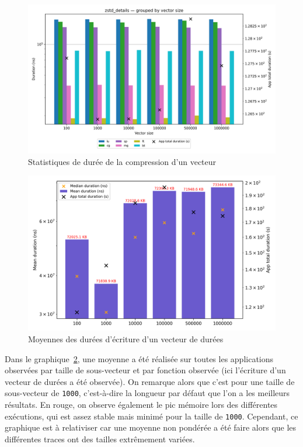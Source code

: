 \begin{figure}[!h]
    \centering
    \includegraphics[width=1\textwidth]{img/zstd_details.png}
    \caption{Statistiques de durée de la compression d'un vecteur}
    \label{fig:c}
\end{figure}
\begin{figure}[!h]
    \centering
    \includegraphics[width=1\textwidth]{img/write_dur_subvec_bof.png}
    \caption{Moyennes des durées d'écriture d'un vecteur de durées}
    \label{fig:d}
\end{figure}
Dans le graphique~\ref{fig:d}, une moyenne a été réalisée sur toutes les applications observées par taille de sous-vecteur et par fonction observée (ici l'écriture d'un vecteur de durées a été observée).
On remarque alors que c'est pour une taille de sous-vecteur de \verb!1000!, c'est-à-dire la longueur par défaut que l'on a les meilleurs résultats. 
En rouge, on observe également le pic mémoire lors des différentes exécutions, qui est assez stable mais minimé pour la taille de \verb!1000!.
Cependant, ce graphique est à relativiser car une moyenne non pondérée a été faire alors que les différentes traces ont des tailles extrêmement variées.

